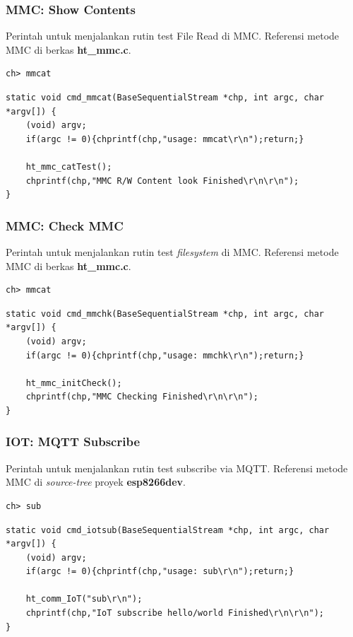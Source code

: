 \documentclass[12pt,]{article}
\begin{document}
	\subsubsection{MMC: Show Contents}
	Perintah untuk menjalankan rutin test File Read di MMC.
	Referensi metode MMC di berkas \textbf{ht\_mmc.c}.
	\begin{verbatim}
ch> mmcat
	\end{verbatim}
	
	\begin{verbatim}
static void cmd_mmcat(BaseSequentialStream *chp, int argc, char *argv[]) {
	(void) argv;
	if(argc != 0){chprintf(chp,"usage: mmcat\r\n");return;}
	
	ht_mmc_catTest();
	chprintf(chp,"MMC R/W Content look Finished\r\n\r\n");
}
	\end{verbatim}
	
	\subsubsection{MMC: Check MMC}
	Perintah untuk menjalankan rutin test \textit{filesystem} di MMC.
	Referensi metode MMC di berkas \textbf{ht\_mmc.c}.
	\begin{verbatim}
ch> mmcat
	\end{verbatim}
	
	\begin{verbatim}
static void cmd_mmchk(BaseSequentialStream *chp, int argc, char *argv[]) {
	(void) argv;
	if(argc != 0){chprintf(chp,"usage: mmchk\r\n");return;}
	
	ht_mmc_initCheck();
	chprintf(chp,"MMC Checking Finished\r\n\r\n");
}
	\end{verbatim}
	
	\subsubsection{IOT: MQTT Subscribe}
	Perintah untuk menjalankan rutin test subscribe via MQTT.
	Referensi metode MMC di \textit{source-tree} proyek \textbf{esp8266dev}.
	\begin{verbatim}
ch> sub
	\end{verbatim}
	
	\begin{verbatim}
static void cmd_iotsub(BaseSequentialStream *chp, int argc, char *argv[]) {
	(void) argv;
	if(argc != 0){chprintf(chp,"usage: sub\r\n");return;}
	
	ht_comm_IoT("sub\r\n");
	chprintf(chp,"IoT subscribe hello/world Finished\r\n\r\n");
}
	\end{verbatim}
	
\end{document}
